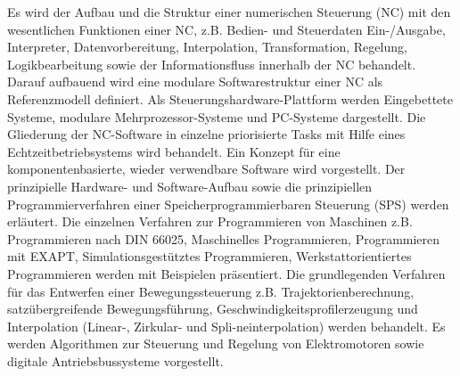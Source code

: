 \begin{module}
\begin{content}
Es wird der Aufbau und die Struktur einer numerischen Steuerung (NC) mit den wesentlichen Funktionen einer NC, z.B. Bedien- und Steuerdaten Ein-/Ausgabe, Interpreter, Datenvorbereitung, Interpolation, Transformation, Regelung, Logikbearbeitung sowie der Informationsfluss innerhalb der NC behandelt. Darauf aufbauend wird eine modulare Softwarestruktur einer NC als Referenzmodell definiert. Als Steuerungshardware-Plattform werden Eingebettete Systeme, modulare Mehrprozessor-Systeme und PC-Systeme dargestellt. Die Gliederung der NC-Software in einzelne priorisierte Tasks mit Hilfe eines Echtzeitbetriebsystems wird behandelt. Ein Konzept für eine komponentenbasierte, wieder verwendbare Software wird vorgestellt. Der prinzipielle Hardware- und Software-Aufbau sowie die prinzipiellen Programmierverfahren einer Speicherprogrammierbaren Steuerung (SPS) werden erläutert. Die einzelnen Verfahren zur Programmieren von Maschinen z.B. Programmieren nach DIN 66025, Maschinelles Programmieren, Programmieren mit EXAPT, Simulationsgestütztes Programmieren, Werkstattorientiertes Programmieren werden mit Beispielen präsentiert. Die grundlegenden Verfahren für das Entwerfen einer Bewegungssteuerung z.B. Trajektorienberechnung, satzübergreifende Bewegungsführung, Geschwindigkeitsprofilerzeugung und Interpolation (Linear-, Zirkular- und Spli-neinterpolation) werden behandelt. Es werden Algorithmen zur Steuerung und Regelung von Elektromotoren sowie digitale Antriebsbussysteme vorgestellt.


\end{content}



\end{module}

